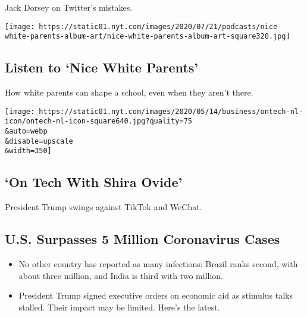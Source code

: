 Jack Dorsey on Twitter's mistakes.

\href{/2020/08/06/podcasts/episode-three-this-is-our-school-how-dare-you.html}{}

\texttt{[image: https://static01.nyt.com/images/2020/07/21/podcasts/nice-white-parents-album-art/nice-white-parents-album-art-square320.jpg]}

\href{/2020/08/06/podcasts/episode-three-this-is-our-school-how-dare-you.html}{}

\hypertarget{listen-to-nice-white-parents}{%
\subsection{Listen to `Nice White
Parents'}\label{listen-to-nice-white-parents}}

How white parents can shape a school, even when they aren't there.

\href{/2020/08/07/technology/trump-tiktok-wechat.html}{}

\texttt{[image: https://static01.nyt.com/images/2020/05/14/business/ontech-nl-icon/ontech-nl-icon-square640.jpg?quality=75\\\&auto=webp\\\&disable=upscale\\\&width=350]}

\href{/2020/08/07/technology/trump-tiktok-wechat.html}{}

\hypertarget{on-tech-with-shira-ovide}{%
\subsection{`On Tech With Shira Ovide'}\label{on-tech-with-shira-ovide}}

President Trump swings against TikTok and WeChat.

\href{/2020/08/08/world/coronavirus-updates.html}{}

\hypertarget{us-surpasses-5-million-coronavirus-cases}{%
\subsection{U.S. Surpasses 5 Million Coronavirus
Cases}\label{us-surpasses-5-million-coronavirus-cases}}

\begin{itemize}
\tightlist
\item
  No other country has reported as many infections: Brazil ranks second,
  with about three million, and India is third with two million.
\item
  President Trump signed executive orders on economic aid as stimulus
  talks stalled. Their impact may be limited. Here's the latest.
\end{itemize}

